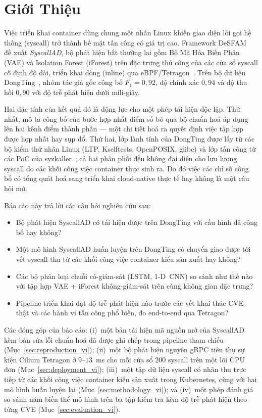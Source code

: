 \section{Giới Thiệu}
\label{sec:intro_vi}

Việc triển khai container dùng chung một nhân Linux khiến giao diện
lời gọi hệ thống (syscall) trở thành bề mặt tấn công có giá trị cao.
Framework DeSFAM~\cite{desfam2025} đề xuất \emph{SyscallAD}, bộ phát
hiện bất thường lai gồm Bộ Mã Hóa Biến Phân (VAE) và Isolation Forest
(iForest) trên đặc trưng thủ công của các cửa sổ syscall cố định độ
dài, triển khai dòng (inline) qua eBPF/Tetragon~\cite{tetragon}. Trên
bộ dữ liệu DongTing~\cite{dongting}, nhóm tác giả gốc công bố
$F_{1}=0{,}92$, độ chính xác $0{,}94$ và độ thu hồi $0{,}90$ với độ
trễ phát hiện dưới mili-giây.

Hai đặc tính của kết quả đó là động lực cho một phép tái hiện độc
lập. Thứ nhất, mô tả công bố của bước hợp nhất điểm số bỏ qua bộ
chuẩn hoá áp dụng lên hai kênh điểm thành phần --- một chi tiết hoá
ra quyết định việc tập hợp được hợp nhất hay sụp đổ. Thứ hai, lớp lành
tính của DongTing được lấy từ các bộ kiểm thử nhân Linux (LTP,
Kselftests, OpenPOSIX, glibc) và lớp tấn công từ các PoC của
syzkaller~\cite{syzkaller}; cả hai phân phối đều không đại diện cho
lưu lượng syscall do các khối công việc container thực sinh ra. Do đó
việc các chỉ số công bố có tổng quát hoá sang triển khai cloud-native
thực tế hay không là một câu hỏi mở.

Báo cáo này trả lời các câu hỏi nghiên cứu sau:
\begin{itemize}
  \item[\textbf{CH1.}] Bộ phát hiện SyscallAD có tái hiện được trên
        DongTing với cấu hình đã công bố hay không?
  \item[\textbf{CH2.}] Một mô hình SyscallAD huấn luyện trên DongTing
        có chuyển giao được tới vết syscall thu từ các khối công việc
        container kiểu sản xuất hay không?
  \item[\textbf{CH3.}] Các bộ phân loại chuỗi có-giám-sát (LSTM,
        1-D~CNN) so sánh như thế nào với tập hợp VAE + iForest
        không-giám-sát trên cùng không gian đặc trưng?
  \item[\textbf{CH4.}] Pipeline triển khai đạt độ trễ phát hiện nào
        trước các vết khai thác CVE thật và các hành vi tấn công phổ
        biến, đo end-to-end qua Tetragon?
\end{itemize}

Các đóng góp của báo cáo: (i)~một bản tái hiện mã nguồn mở của
SyscallAD kèm bản sửa lỗi chuẩn hoá đã được ghi chép trong pipeline
tham chiếu (Mục~\ref{sec:reproduction_vi}); (ii)~một bộ phát hiện
nguyên gRPC tiêu thụ sự kiện Cilium Tetragon ở $9$--$13$~ms cho mỗi
cửa sổ $200$ syscall trên một lõi CPU đơn (Mục~\ref{sec:deployment_vi});
(iii)~một tập dữ liệu syscall có nhãn thu trực tiếp từ các khối công
việc container kiểu sản xuất trong Kubernetes, cùng với hai mô hình
huấn luyện lại (Mục~\ref{sec:methodology_vi}); và (iv)~một phép đánh
giá so sánh năm biến thể mô hình trên ba tập kiểm tra kèm độ trễ phát
hiện theo từng CVE (Mục~\ref{sec:evaluation_vi}).

